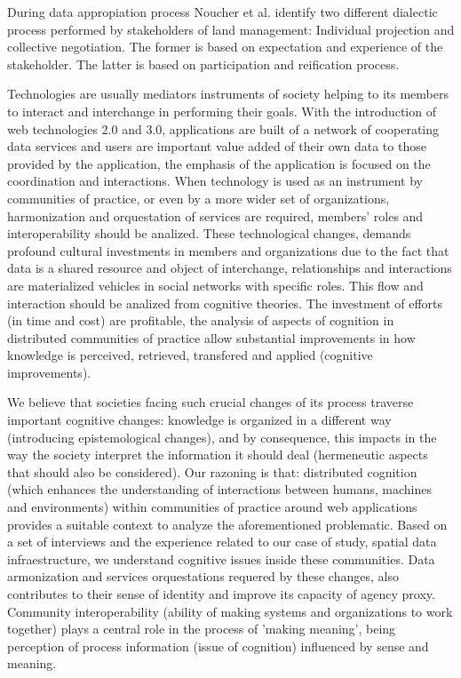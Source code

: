 \documentclass[10pt,twocolumn,ieeetran]{article}
\begin{document}
During data appropiation process Noucher et al. \cite{Noucher1} identify two different dialectic process  performed by stakeholders of land management: Individual projection and collective negotiation.
The former is based on expectation and experience of the stakeholder. The latter is based on participation
and reification process. 



Technologies are usually mediators instruments of society helping to its members to interact and interchange in performing their goals. With the introduction of web technologies 2.0 and 3.0, applications are built  of a network of cooperating data services and users are important value added of their own data to those provided by the application, the emphasis of the application is focused on the coordination and interactions. 
When technology is used as an instrument by communities of practice, or even by a more wider set of organizations, harmonization and orquestation of services are required, members' roles and interoperability should be analized. 
These technological changes, demands profound cultural investments in members and organizations due to the fact that data is a shared resource and object of interchange, relationships and interactions are materialized vehicles in social networks with specific roles. This flow and interaction should be analized from cognitive theories. The investment of efforts (in time and cost) are profitable, the analysis of aspects of cognition in distributed communities of practice allow substantial improvements in how knowledge is perceived, retrieved, transfered and applied (cognitive improvements).


We believe that societies facing such crucial changes of its process traverse important cognitive changes: knowledge is organized in a different way (introducing epistemological changes), and by consequence, this impacts in the way the society interpret the information it should deal (hermeneutic aspects that should also be considered). Our razoning is that: distributed cognition (which enhances the understanding of interactions between humans, machines and environments) within communities of practice around web applications provides a suitable context to analyze the aforementioned problematic. Based on a set of interviews and the experience related to our case of study, spatial data infraestructure, we understand cognitive issues inside these communities. Data armonization and services orquestations requered by these changes, also contributes to their sense of identity and improve its capacity of agency proxy. Community interoperability (ability of making systems and organizations to work together) plays a central role in the process of 'making meaning',
being perception of process information (issue of cognition) influenced by sense and meaning. 
\end{document}
